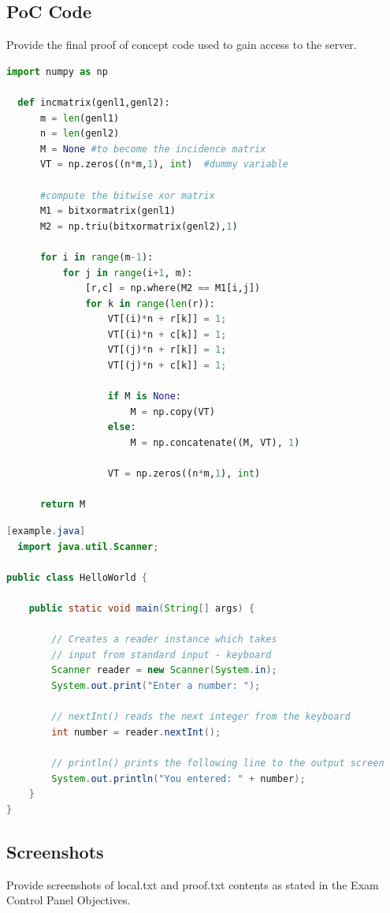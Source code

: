 \documentclass[a4paper]{article}
\begin{document}
\subsection{PoC Code}
Provide the final proof of concept code used to gain access to the server.

\begin{lstlisting}[language=Python]
  import numpy as np
      
  def incmatrix(genl1,genl2):
      m = len(genl1)
      n = len(genl2)
      M = None #to become the incidence matrix
      VT = np.zeros((n*m,1), int)  #dummy variable
      
      #compute the bitwise xor matrix
      M1 = bitxormatrix(genl1)
      M2 = np.triu(bitxormatrix(genl2),1) 
  
      for i in range(m-1):
          for j in range(i+1, m):
              [r,c] = np.where(M2 == M1[i,j])
              for k in range(len(r)):
                  VT[(i)*n + r[k]] = 1;
                  VT[(i)*n + c[k]] = 1;
                  VT[(j)*n + r[k]] = 1;
                  VT[(j)*n + c[k]] = 1;
                  
                  if M is None:
                      M = np.copy(VT)
                  else:
                      M = np.concatenate((M, VT), 1)
                  
                  VT = np.zeros((n*m,1), int)
      
      return M
  \end{lstlisting}

\begin{lstlisting}[language=Java][example.java]
  import java.util.Scanner;

public class HelloWorld {

    public static void main(String[] args) {

        // Creates a reader instance which takes
        // input from standard input - keyboard
        Scanner reader = new Scanner(System.in);
        System.out.print("Enter a number: ");

        // nextInt() reads the next integer from the keyboard
        int number = reader.nextInt();

        // println() prints the following line to the output screen
        System.out.println("You entered: " + number);
    }
}
\end{lstlisting}

\subsection{Screenshots}
Provide screenshots of local.txt and proof.txt contents as stated in the Exam Control Panel Objectives.
\end{document}
